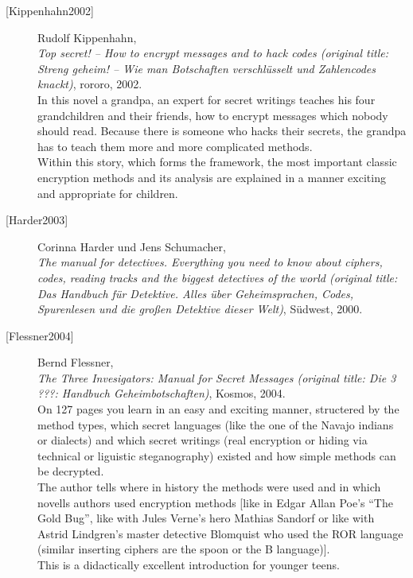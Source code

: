 \begin{description}
\item[\textrm{[Kippenhahn2002]}] 
    Rudolf Kippenhahn, \\
    {\em Top secret! -- How to encrypt messages and to hack codes (original
    title: Streng geheim! -- Wie man Botschaften verschl\"usselt und 
    Zahlencodes knackt)}, rororo, 2002. \\
    In this novel a grandpa, an expert for secret writings teaches his
    four grandchildren and their friends, how to encrypt messages which
    nobody should read. Because there is someone who hacks their secrets,
    the grandpa has to teach them more and more complicated methods. \\
    Within this story, which forms the framework, the most important classic
    encryption methods and its analysis are explained in a manner exciting
    and appropriate for children.\\


\item[\textrm{[Harder2003]}] 
    Corinna Harder und Jens Schumacher, \\
    {\em The manual for detectives. Everything you need to know about
     ciphers, codes, reading tracks and the biggest detectives of the world
     (original title: Das Handbuch f\"ur Detektive. Alles \"uber
     Geheimsprachen, Codes, Spurenlesen und die gro\ss en Detektive dieser
     Welt)}, S\"udwest, 2000. \\


\item[\textrm{[Flessner2004]}] 
    Bernd Flessner, \\
    {\em The Three Invesigators: Manual for Secret Messages (original
    title: Die 3 ???: Handbuch Geheimbotschaften)},
    Kosmos, 2004. \\
    On 127 pages you learn in an easy and exciting manner, structered by
    the method types, which secret languages (like the one of the Navajo
    indians or dialects) and which secret writings (real encryption or
    hiding via technical or liguistic steganography) existed and how simple
    methods can be decrypted.\\
    The author tells where in history the methods were used and in which
    novells authors used encryption methods [like in Edgar Allan Poe's
    ``The Gold Bug'', like with Jules Verne's hero Mathias Sandorf or like
    with Astrid Lindgren's master detective Blomquist who used the ROR language
    (similar inserting ciphers are the spoon or the B language)].\\
    This is a didactically excellent introduction for younger teens.\\


\end{description}

